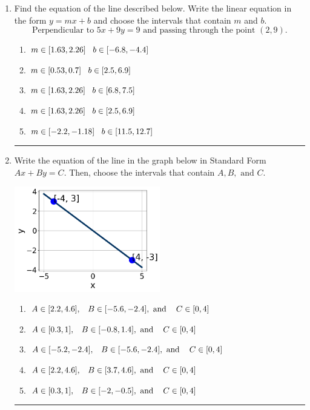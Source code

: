 \documentclass[14pt]{extbook}
\newcommand{\litem}[1]{\item#1\hspace*{-1cm}\rule{\textwidth}{0.4pt}}
\begin{document}
\begin{enumerate}
{\begin{enumerate}[label=\Alph*.]
\end{enumerate} }
\litem{
Find the equation of the line described below. Write the linear equation in the form $ y=mx+b $ and choose the intervals that contain $m$ and $b$.\[ \text{Perpendicular to } 5 x + 9 y = 9 \text{ and passing through the point } (2, 9). \]\begin{enumerate}[label=\Alph*.]
\item \( m \in [1.63, 2.26] \hspace*{3mm} b \in [-6.8, -4.4] \)
\item \( m \in [0.53, 0.7] \hspace*{3mm} b \in [2.5, 6.9] \)
\item \( m \in [1.63, 2.26] \hspace*{3mm} b \in [6.8, 7.5] \)
\item \( m \in [1.63, 2.26] \hspace*{3mm} b \in [2.5, 6.9] \)
\item \( m \in [-2.2, -1.18] \hspace*{3mm} b \in [11.5, 12.7] \)

\end{enumerate} }
\litem{
Write the equation of the line in the graph below in Standard Form $Ax+By=C$. Then, choose the intervals that contain $A, B, \text{ and } C$.
\begin{center}
    \includegraphics[width=0.5\textwidth]{../Figures/linearGraphToStandardA.png}
\end{center}
\begin{enumerate}[label=\Alph*.]
\item \( A \in [2.2, 4.6], \hspace{3mm} B \in [-5.6, -2.4], \text{ and } \hspace{3mm} C \in [0, 4] \)
\item \( A \in [0.3, 1], \hspace{3mm} B \in [-0.8, 1.4], \text{ and } \hspace{3mm} C \in [0, 4] \)
\item \( A \in [-5.2, -2.4], \hspace{3mm} B \in [-5.6, -2.4], \text{ and } \hspace{3mm} C \in [0, 4] \)
\item \( A \in [2.2, 4.6], \hspace{3mm} B \in [3.7, 4.6], \text{ and } \hspace{3mm} C \in [0, 4] \)
\item \( A \in [0.3, 1], \hspace{3mm} B \in [-2, -0.5], \text{ and } \hspace{3mm} C \in [0, 4] \)


\end{enumerate}}
\end{enumerate}
\end{document}
